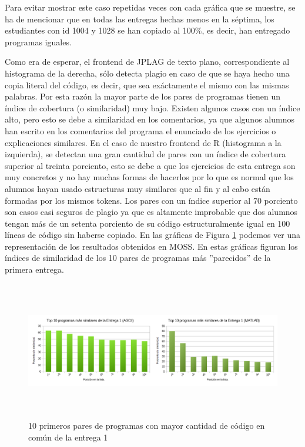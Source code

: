 Para evitar mostrar este caso repetidas veces con cada gráfica que se muestre, se ha de mencionar que en todas las entregas hechas menos en la séptima, los estudiantes con id 1004 y 1028 se han copiado al 100\%, es decir, han entregado programas iguales.
\newline
\bigskip

Como era de esperar, el frontend de JPLAG de texto plano, correspondiente al histograma de la derecha, sólo detecta plagio en caso de que se haya hecho una copia literal del código, es decir, que sea exáctamente el mismo con las mismas palabras. Por esta razón la mayor parte de los pares de programas tienen un índice de cobertura (o similaridad) muy bajo. Existen algunos casos con un índice alto, pero esto se debe a similaridad en los comentarios, ya que algunos alumnos han escrito en los comentarios del programa el enunciado de los ejercicios o explicaciones similares.
\newline
En el caso de nuestro frontend de R (histograma a la izquierda), se detectan una gran cantidad de pares con un índice de cobertura superior al treinta porciento, esto se debe a que los ejercicios de esta entrega son muy concretos y no hay muchas formas de hacerlos por lo que es normal que los alumnos hayan usado estructuras muy similares que al fin y al cabo están formadas por los mismos tokens.
\newline
Los pares con un índice superior al 70 porciento son casos casi seguros de plagio ya que es altamente improbable que dos alumnos tengan más de un setenta porciento de su código estructuralmente igual en 100 líneas de código sin haberse copiado.
\newline
En las gráficas de Figura \ref{fig:TOP10_1} podemos ver una representación de los resultados obtenidos en MOSS.
\newline 
En estas gráficas figuran los índices de similaridad de los 10 pares de programas más ''parecidos'' de la primera entrega. 


\begin{figure}[H] %
\centering
\includegraphics[width=14cm, height=6cm]{imagenes/TOP10_1.png}  %
\caption{10 primeros pares de programas con mayor cantidad de código en común de la entrega 1} \label{fig:TOP10_1}
\end{figure}


